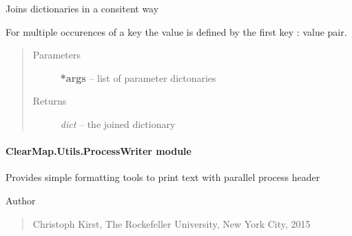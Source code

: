 \documentclass[letterpaper,10pt,english]{sphinxmanual}
\begin{document}

\begin{fulllineitems}
\label{api/ClearMap.Utils:ClearMap.Utils.ParameterTools.joinParameter}
Joins dictionaries in a consitent way

For multiple occurences of a key the  value is defined by the first key : value pair.
\begin{quote}\begin{description}
\item[{Parameters}] \leavevmode
\textbf{*args} --
list of parameter dictonaries

\item[{Returns}] \leavevmode
\emph{dict} --
the joined dictionary

\end{description}\end{quote}

\end{fulllineitems}



\paragraph{ClearMap.Utils.ProcessWriter module}
\label{api/ClearMap.Utils:module-ClearMap.Utils.ProcessWriter}\label{api/ClearMap.Utils:clearmap-utils-processwriter-module}
Provides simple formatting tools to print text with parallel process header

Author
\begin{quote}

Christoph Kirst, The Rockefeller University, New York City, 2015
\end{quote}
\end{document}
